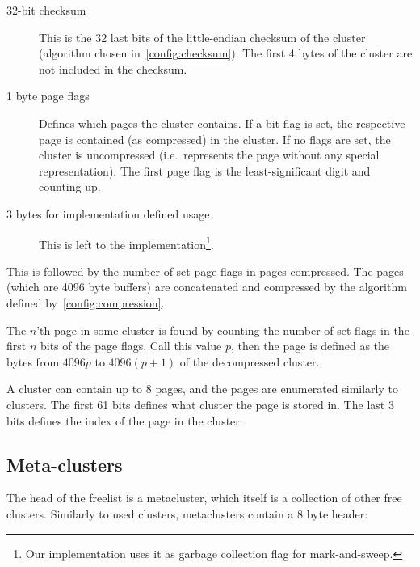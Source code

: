 \documentclass[11pt,a4paper]{report}
\newcommand{\pagesize}{4096 }
\begin{document}
        \begin{description}
            \item [32-bit checksum] This is the 32 last bits of the
                little-endian checksum of the cluster (algorithm
                chosen in~\ref{config:checksum}). The first 4 bytes of
                the cluster are not included in the checksum.
            \item [1 byte page flags] Defines which pages the cluster contains.
                If a bit flag is set, the respective page is contained (as
                compressed) in the cluster. If no flags are set, the cluster is
                uncompressed (i.e.\ represents the page without any special
                representation). The first page flag is the least-significant
                digit and counting up.
            \item [3 bytes for implementation defined usage] This is
                left to the implementation\footnote{Our implementation
                uses it as garbage collection flag for mark-and-sweep.}.
        \end{description}

        This is followed by the number of set page flags in pages compressed.
        The pages (which are \pagesize byte buffers) are concatenated and
        compressed by the algorithm defined by~\ref{config:compression}.

        The $n$'th page in some cluster is found by counting the number of set
        flags in the first $n$ bits of the page flags. Call this value $p$,
        then the page is defined as the bytes from $\pagesize p$ to $\pagesize
        (p + 1)$ of the decompressed cluster.

        A cluster can contain up to 8 pages, and the pages are enumerated
        similarly to clusters. The first 61 bits defines what cluster the page
        is stored in. The last 3 bits defines the index of the page in the
        cluster.

        \subsection{Meta-clusters}
        \label{cluster:metacluster}
        The head of the freelist is a metacluster, which itself is a collection
        of other free clusters. Similarly to used clusters, metaclusters
        contain a 8 byte header:
\end{document}
